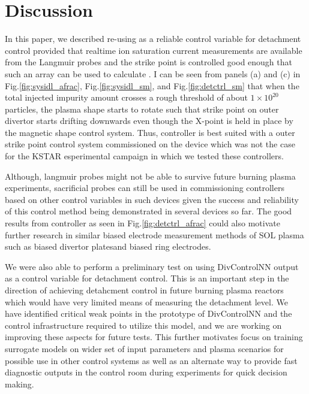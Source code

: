 \section{Discussion}
\label{sec:discussion}

In this paper, we described re-using \Afrac as a reliable control variable for detachment control provided that realtime ion saturation current measurements are available from the Langmuir probes and the strike point is controlled good enough that such an array can be used to calculate \Afrac. I can be seen from panels (a) and (c) in Fig.\ref{fig:sysidl_afrac}, Fig.\ref{fig:sysidl_sm}, and Fig.\ref{fig:detctrl_sm} that when the total injected impurity amount crosses a rough threshold of about $1\times10^{20}$ particles, the plasma shape starts to rotate such that strike point on outer divertor starts drifting downwards even though the X-point is held in place by the magnetic shape control system. Thus, \Afrac controller is best suited with a outer strike point control system commissioned on the device which was not the case for the KSTAR esperimental campaign in which we tested these controllers.

Although, langmuir probes might not be able to survive future burning plasma experiments, sacrificial probes can still be used in commissioning controllers based on other control variables in such devices given the success and reliability of this control method being demonstrated in several devices so far\needcite. The good results from \Afrac controller as seen in Fig.\ref{fig:detctrl_afrac} could also motivate further research in similar biased electrode measurement methods of SOL plasma such as biased divertor plates\needcite and biased ring electrodes\needcite.

We were also able to perform a preliminary test on using DivControlNN output as a control variable for detachment control. This is an important step in the direction of achieving detahcment control in future burning plasma reactors which would have very limited means of measuring the detachment level. We have identified critical weak points in the prototype of DivControlNN and the control infrastructure required to utilize this model, and we are working on improving these aspects for future tests. This further motivates focus on training surrogate models on wider set of input parameters and plasma scenarios for possible use in other control systems as well as an alternate way to provide fast diagnostic outputs in the control room during experiments for quick decision making.

